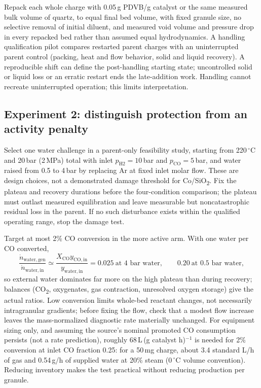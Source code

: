 Repack each whole charge with 0.05\,g PDVB/g catalyst or the same measured bulk volume of quartz, to equal final bed volume, with fixed granule size, no selective removal of initial diluent, and measured void volume and pressure drop in every repacked bed rather than assumed equal hydrodynamics. A handling qualification pilot compares restarted parent charges with an uninterrupted parent control (packing, heat and flow behavior, solid and liquid recovery). A reproducible shift can define the post-handling starting state; uncontrolled solid or liquid loss or an erratic restart ends the late-addition work. Handling cannot recreate uninterrupted operation; this limits interpretation.

\subsection{Experiment 2: distinguish protection from an activity penalty}

Select one water challenge in a parent-only feasibility study, starting from 220\,$^\circ$C and 20\,bar (2\,MPa) total with inlet $p_{\mathrm{H2}}=10$\,bar and $p_{\mathrm{CO}}=5$\,bar, and water raised from 0.5 to 4\,bar by replacing Ar at fixed inlet molar flow. These are design choices, not a demonstrated damage threshold for Co/SiO\textsubscript{2}. Fix the plateau and recovery durations before the four-condition comparison; the plateau must outlast measured equilibration and leave measurable but noncatastrophic residual loss in the parent. If no such disturbance exists within the qualified operating range, stop the damage test.

Target at most 2\% CO conversion in the more active arm. With one water per CO converted,
\begin{equation}
 \frac{\dot n_{\mathrm{water,gen}}}{\dot n_{\mathrm{water,in}}}
 \simeq\frac{X_{\mathrm{CO}}y_{\mathrm{CO,in}}}{y_{\mathrm{water,in}}}
 =0.025\ \text{at 4 bar water},\qquad 0.20\ \text{at 0.5 bar water},
 \label{eq:water-source}
\end{equation}
so external water dominates far more on the high plateau than during recovery; balances (CO\textsubscript{2}, oxygenates, gas contraction, unresolved oxygen storage) give the actual ratios. Low conversion limits whole-bed reactant changes, not necessarily intragranular gradients; before fixing the flow, check that a modest flow increase leaves the mass-normalized diagnostic rate materially unchanged. For equipment sizing only, and assuming the source's nominal promoted CO consumption persists (not a rate prediction), roughly 68\,L\,(g catalyst h)$^{-1}$ is needed for 2\% conversion at inlet CO fraction 0.25: for a 50\,mg charge, about 3.4 standard L/h of gas and 0.54\,g/h of supplied water at 20\% steam (0\,$^\circ$C volume convention). Reducing inventory makes the test practical without reducing production per granule.

